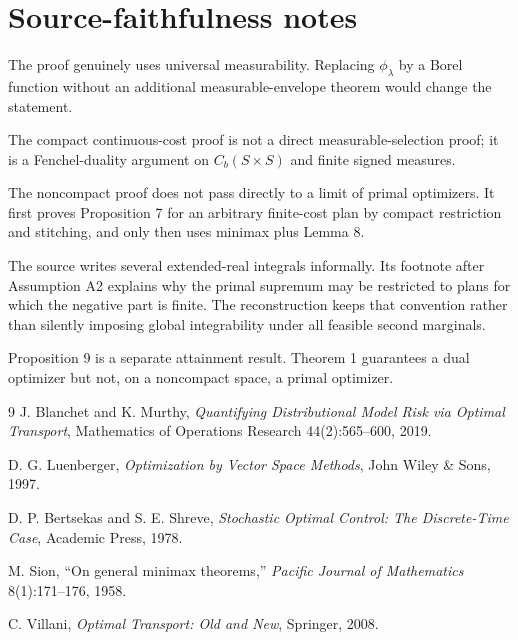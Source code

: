 \section{Source-faithfulness notes}
\begin{commentarynotes}
\item The proof genuinely uses universal measurability.  Replacing $\phi_\lambda$ by a Borel
function without an additional measurable-envelope theorem would change the statement.
\item The compact continuous-cost proof is not a direct measurable-selection proof; it is a
Fenchel-duality argument on $C_b(S\times S)$ and finite signed measures.
\item The noncompact proof does not pass directly to a limit of primal optimizers.  It first proves
Proposition 7 for an arbitrary finite-cost plan by compact restriction and stitching, and only then
uses minimax plus Lemma 8.
\item The source writes several extended-real integrals informally.  Its footnote after Assumption A2
explains why the primal supremum may be restricted to plans for which the negative part is finite.
The reconstruction keeps that convention rather than silently imposing global integrability under
all feasible second marginals.
\item Proposition 9 is a separate attainment result.  Theorem 1 guarantees a dual optimizer but
not, on a noncompact space, a primal optimizer.
\end{commentarynotes}

\begin{thebibliography}{9}
J. Blanchet and K. Murthy,
\emph{Quantifying Distributional Model Risk via Optimal Transport},
Mathematics of Operations Research 44(2):565--600, 2019.

D. G. Luenberger,
\emph{Optimization by Vector Space Methods},
John Wiley \& Sons, 1997.

D. P. Bertsekas and S. E. Shreve,
\emph{Stochastic Optimal Control: The Discrete-Time Case},
Academic Press, 1978.

M. Sion,
``On general minimax theorems,''
\emph{Pacific Journal of Mathematics} 8(1):171--176, 1958.

C. Villani,
\emph{Optimal Transport: Old and New},
Springer, 2008.
\end{thebibliography}


